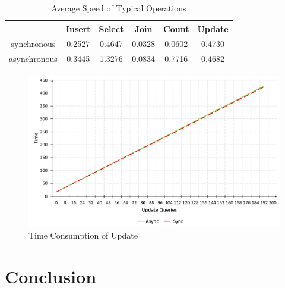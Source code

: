 \documentclass[onecolumn, conference, 12pt]{IEEEtran}
\begin{document}
	\begin{table}
		\centering
		\caption{Average Speed of Typical Operations}
		\begin{tabular}{|c|c|c|c|c|c|}
			\hline
			& Insert & Select & Join & Count & Update\\
			\hline
			synchronous & 0.2527 & 0.4647 & 0.0328 & 0.0602 & 0.4730\\
			\hline
			asynchronous & 0.3445 & 1.3276 & 0.0834 & 0.7716 & 0.4682\\
			\hline
		\end{tabular}
		\label{T2}
	\end{table}
	
	\begin{figure}[!t]
		\centering
		\includegraphics[width=6.5in]{fig/update.png}
		\caption{Time Consumption of Update}
		\label{fig_update}
	\end{figure}
	\section{Conclusion}
	
	
	
	
\end{document}
